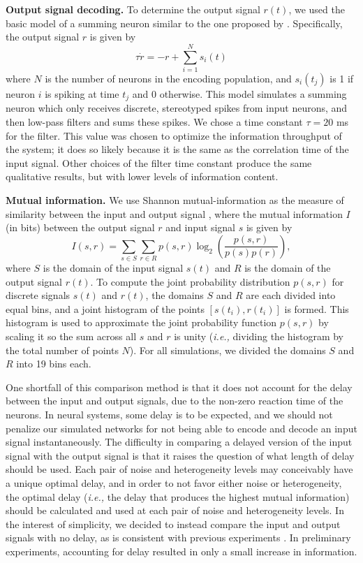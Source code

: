 \documentclass[12pt]{article}
\begin{document}
\textbf{Output signal decoding.} To determine the output signal $r(t)$, we used the basic model of a summing neuron similar to the one proposed by \cite{Stocks2001}. Specifically, the output signal $r$ is given by
\begin{equation}
  \tau \dot{r} = -r + \sum\limits_{i=1}^N s_i(t)
\end{equation}
where $N$ is the number of neurons in the encoding population, and $s_i(t_j)$ is 1 if neuron $i$ is spiking at time $t_j$ and 0 otherwise. This model simulates a summing neuron which only receives discrete, stereotyped spikes from input neurons, and then low-pass filters and sums these spikes.
We chose a time constant $\tau = 20$ ms for the filter. This value was chosen to optimize the information throughput of the system; it does so likely because it is the same as the correlation time of the input signal. Other choices of the filter time constant produce the same qualitative results, but with lower levels of information content.


\textbf{Mutual information.} We use Shannon mutual-information as the measure of similarity between the input and output signal \citep{Heneghan1996,Stocks2001}, where the mutual information $I$ (in bits) between the output signal $r$ and input signal $s$ is given by
\begin{equation}
  I(s,r) = \sum\limits_{s \in S} \sum\limits_{r \in R} p(s,r) \log_2\left(\frac{p(s,r)}{p(s)p(r)}\right),
\end{equation}
where $S$ is the domain of the input signal $s(t)$ and $R$ is the domain of the output signal $r(t)$. To compute the joint probability distribution $p(s,r)$ for discrete signals $s(t)$ and $r(t)$, the domains $S$ and $R$ are each divided into equal bins, and a joint histogram of the points $[s(t_i),r(t_i)]$ is formed. This histogram is used to approximate the joint probability function $p(s,r)$ by scaling it so the sum across all $s$ and $r$ is unity (\emph{i.e.,} dividing the histogram by the total number of points $N$). For all simulations, we divided the domains $S$ and $R$ into 19 bins each.

One shortfall of this comparison method is that it does not account for the delay between the input and output signals, due to the non-zero reaction time of the neurons. In neural systems, some delay is to be expected, and we should not penalize our simulated networks for not being able to encode and decode an input signal instantaneously. The difficulty in comparing a delayed version of the input signal with the output signal is that it raises the question of what length of delay should be used. Each pair of noise and heterogeneity levels may conceivably have a unique optimal delay, and in order to not favor either noise or heterogeneity, the optimal delay (\emph{i.e.,} the delay that produces the highest mutual information) should be calculated and used at each pair of noise and heterogeneity levels. In the interest of simplicity, we decided to instead compare the input and output signals with no delay, as is consistent with previous experiments \citep{Stocks2001}. In preliminary experiments, accounting for delay resulted in only a small increase in information.
\end{document}
